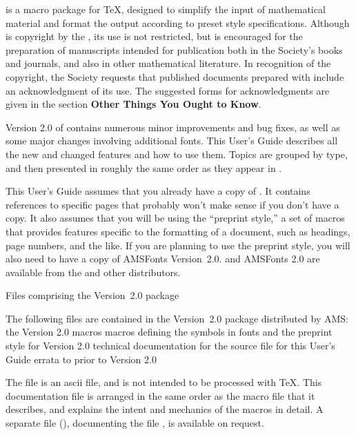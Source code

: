 \AmSTeX{} is a macro package for \TeX, designed to simplify the input
of mathematical material and format the output according to preset
style specifications.  Although \AmSTeX{} is copyright by the \AMS{},
its use is not restricted, but is encouraged for the preparation of
manuscripts intended for publication both in the Society's books and
journals, and also in other mathematical literature.  In recognition of
the copyright, the Society requests that published documents prepared
with \AmSTeX{} include an acknowledgment of its use.  The suggested
forms for acknowledgments are given in the section {\bf Other Things
You Ought to Know}.

Version 2.0 of \AmSTeX{} contains numerous minor improvements
and bug fixes, as well as some major changes involving additional fonts.
This User's Guide describes all the new and changed features and how
to use them.  Topics are grouped by type, and then presented in roughly
the same order as they appear in \JoT{}.

This User's Guide assumes that you already have a copy of \JoT{}.
It contains references to specific pages that probably won't make
sense if you don't have a copy.
It also assumes that you will be using the ``preprint style,'' a set
of macros that provides features specific to the formatting of a
document, such as headings, page numbers, and the like.
If you are planning to use the preprint style, you will also need to
have a copy of AMSFonts Version~2.0.  \JoT{} and AMSFonts 2.0 are
available from the \AMS{} and other distributors.

\vfil\eject                     %

\subhead Files comprising the \AmSTeX{} Version~2.0 package
\endsubhead

The following files are contained in the \AmSTeX{} Version~2.0 package
distributed by AMS:
\beginexample{\exboxwidth=1.125in}
 the \AmSTeX{} Version 2.0 macros
 macros defining the symbols in fonts  %
        and 
 the preprint style for \AmSTeX{} Version 2.0
 technical documentation for 
 the source file for this User's Guide
 errata to \JoT{} prior to \AmSTeX{} Version 2.0
\endexample

The file  is an  {\smc ascii} file, and is
not intended to be processed with \TeX{}\null.  This  documentation file
is arranged in the same order as the macro file that it describes, and
explains the intent and mechanics of the macros in detail.  A separate
file (), documenting the file ,
is available on request.

